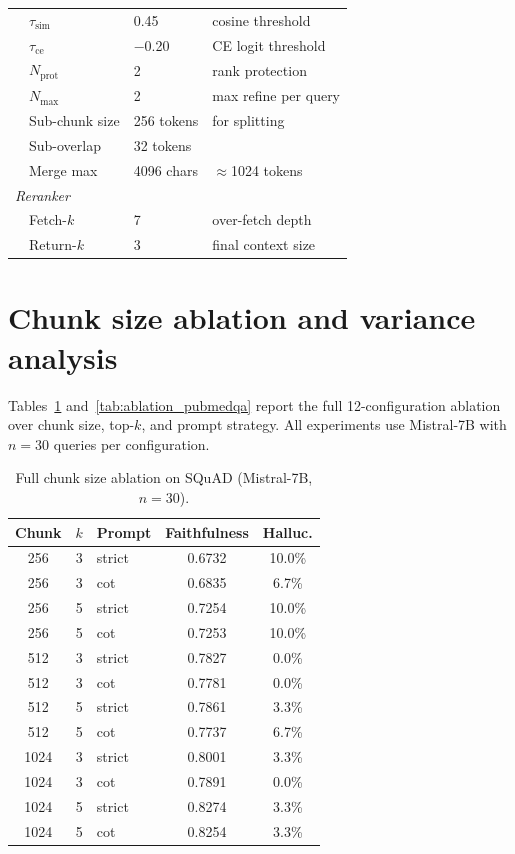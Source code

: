 \begin{table}[!htb]
\begin{tabular}{llll}
& $\tau_\text{sim}$ & 0.45 & cosine threshold \\
& $\tau_\text{ce}$ & $-$0.20 & CE logit threshold \\
& $N_\text{prot}$ & 2 & rank protection \\
& $N_\text{max}$ & 2 & max refine per query \\
& Sub-chunk size & 256 tokens & for splitting \\
& Sub-overlap & 32 tokens & \\
& Merge max & 4096 chars & $\approx$1024 tokens \\
\midrule
\multicolumn{4}{l}{\emph{Reranker}} \\
& Fetch-$k$ & 7 & over-fetch depth \\
& Return-$k$ & 3 & final context size \\
\bottomrule
\end{tabular}
\end{table}

\FloatBarrier
\section{Chunk size ablation and variance analysis}
\label{app:ablation}

Tables~\ref{tab:ablation_squad} and~\ref{tab:ablation_pubmedqa} report
the full 12-configuration ablation over chunk size, top-$k$, and prompt
strategy. All experiments use Mistral-7B with $n = 30$ queries per
configuration.

\begin{table}[!htb]
\centering
\caption{Full chunk size ablation on SQuAD (Mistral-7B, $n = 30$).}
\label{tab:ablation_squad}
\small
\begin{tabular}{cclcc}
\toprule
Chunk & $k$ & Prompt & Faithfulness & Halluc. \\
\midrule
256  & 3 & strict & 0.6732 & 10.0\% \\
256  & 3 & cot    & 0.6835 & 6.7\% \\
256  & 5 & strict & 0.7254 & 10.0\% \\
256  & 5 & cot    & 0.7253 & 10.0\% \\
\midrule
512  & 3 & strict & 0.7827 & 0.0\% \\
512  & 3 & cot    & 0.7781 & 0.0\% \\
512  & 5 & strict & 0.7861 & 3.3\% \\
512  & 5 & cot    & 0.7737 & 6.7\% \\
\midrule
1024 & 3 & strict & 0.8001 & 3.3\% \\
1024 & 3 & cot    & 0.7891 & 0.0\% \\
1024 & 5 & strict & 0.8274 & 3.3\% \\
1024 & 5 & cot    & 0.8254 & 3.3\% \\
\bottomrule
\end{tabular}
\end{table}

